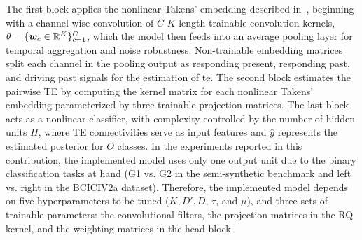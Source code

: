 The first block applies the nonlinear Takens' embedding described in~, beginning with a channel-wise convolution of $C$ $K$-length trainable convolution kernels, $\theta=\{{\bm{w}}_c\in\mathbb{R}^{K}\}_{c=1}^C$, which the model then feeds into an average pooling layer for temporal aggregation and noise robustness. Non-trainable embedding matrices split each channel in the pooling output as responding present, responding past, and driving past signals for the estimation of \gls{te}. The second block estimates the pairwise TE by computing the kernel matrix for each nonlinear Takens' embedding parameterized by three trainable projection matrices. The last block acts as a nonlinear classifier, with complexity controlled by the number of hidden units $H$, where TE connectivities serve as input features and $\hat{y}$ represents the estimated posterior for $O$ classes. {In the experiments reported in this contribution, the implemented model uses} only one output unit due to the binary classification tasks at hand (G1 vs. G2 in the semi-synthetic benchmark and left vs. right in the BCICIV2a dataset). Therefore, the implemented model depends on five hyperparameters to be tuned ($K,D',D$, $\tau$, and $\mu$), and three sets of trainable parameters: the convolutional filters, the projection matrices in the RQ kernel, and the weighting matrices in the head block.
